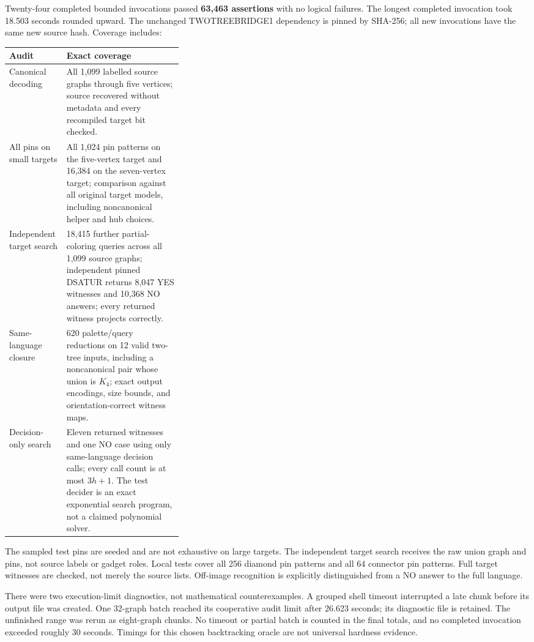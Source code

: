 \documentclass[11pt]{article}
\begin{document}
Twenty-four completed bounded invocations passed \textbf{63,463 assertions}
with no logical failures. The longest completed invocation took 18.503 seconds
rounded upward. The unchanged TWOTREEBRIDGE1 dependency is pinned by SHA-256;
all new invocations have the same new source hash. Coverage includes:
\begin{center}\small
\begin{tabularx}{\linewidth}{p{0.33\linewidth}X}\toprule
Audit & Exact coverage\\\midrule
Canonical decoding & All 1,099 labelled source graphs through five vertices;
source recovered without metadata and every recompiled target bit checked.\\
All pins on small targets & All 1,024 pin patterns on the five-vertex target
and 16,384 on the seven-vertex target; comparison against all original target
models, including noncanonical helper and hub choices.\\
Independent target search & 18,415 further partial-coloring queries across
all 1,099 source graphs; independent pinned DSATUR returns 8,047 YES witnesses
and 10,368 NO answers; every returned witness projects correctly.\\
Same-language closure & 620 palette/query reductions on 12 valid two-tree
inputs, including a noncanonical pair whose union is $K_4$; exact output
encodings, size bounds, and orientation-correct witness maps.\\
Decision-only search & Eleven returned witnesses and one NO case using only
same-language decision calls; every call count is at most $3h+1$. The test
decider is an exact exponential search program, not a claimed polynomial solver.\\\bottomrule
\end{tabularx}\end{center}

The sampled test pins are seeded and are not exhaustive on large targets.
The independent target search receives the raw union graph and pins, not
source labels or gadget roles. Local tests cover all 256 diamond pin patterns
and all 64 connector pin patterns. Full target witnesses are checked, not
merely the source lists. Off-image recognition is explicitly distinguished
from a NO answer to the full language.

There were two execution-limit diagnostics, not mathematical counterexamples.
A grouped shell timeout interrupted a late chunk before its output file was
created. One 32-graph batch reached its cooperative audit limit after 26.623
seconds; its diagnostic file is retained. The unfinished range was rerun as
eight-graph chunks. No timeout or partial batch is counted in the final totals,
and no completed invocation exceeded roughly 30 seconds. Timings for this
chosen backtracking oracle are not universal hardness evidence.
\end{document}
